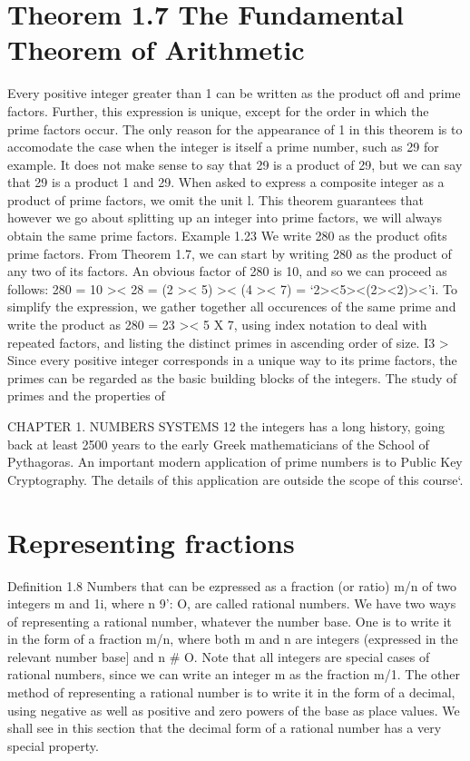 \section{Theorem 1.7 The Fundamental Theorem of Arithmetic} Every positive integer greater than
1 can be written as the product ofl and prime factors. Further, this expression is unique, except
for the order in which the prime factors occur.
The only reason for the appearance of 1 in this theorem is to accomodate the case when the integer
is itself a prime number, such as 29 for example. It does not make sense to say that 29 is a product
of 29, but we can say that 29 is a product 1 and 29. When asked to express a composite integer
as a product of prime factors, we omit the unit l. This theorem guarantees that however we go
about splitting up an integer into prime factors, we will always obtain the same prime factors.
Example 1.23 We write 280 as the product ofits prime factors. From Theorem 1.7, we can start
by writing 280 as the product of any two of its factors. An obvious factor of 280 is 10, and so we
can proceed as follows:
280 = 10 >< 28
= (2 >< 5) >< (4 >< 7)
= ‘2><5><(2><2)><'i.
To simplify the expression, we gather together all occurences of the same prime and write the
product as
280 = 23 >< 5 X 7,
using index notation to deal with repeated factors, and listing the distinct primes in ascending
order of size. I3 >
Since every positive integer corresponds in a unique way to its prime factors, the primes can be
regarded as the basic building blocks of the integers. The study of primes and the properties of



CHAPTER 1. NUMBERS SYSTEMS 12
the integers has a long history, going back at least 2500 years to the early Greek mathematicians
of the School of Pythagoras. An important modern application of prime numbers is to Public Key
Cryptography. The details of this application are outside the scope of this course‘.
\section{Representing fractions}
Deﬁnition 1.8 Numbers that can be ezpressed as a fraction (or ratio) m/n of two integers m and
1i, where n 9’: O, are called rational numbers.
We have two ways of representing a rational number, whatever the number base. One is to write it
in the form of a fraction m/n, where both m and n are integers (expressed in the relevant number
base] and n # O. Note that all integers are special cases of rational numbers, since we can write
an integer m as the fraction m/1.
The other method of representing a rational number is to write it in the form of a decimal, using
negative as well as positive and zero powers of the base as place values. We shall see in this section
that the decimal form of a rational number has a very special property.
